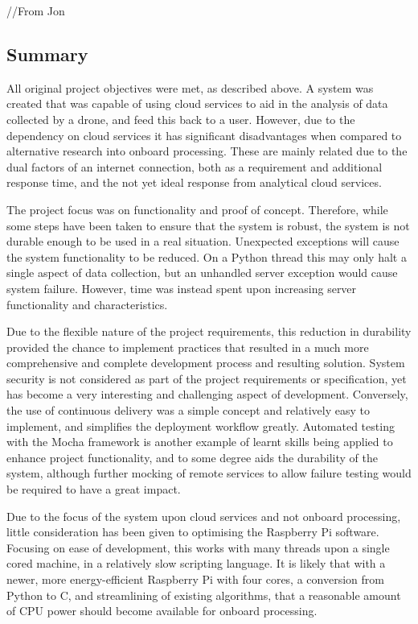 \documentclass{article}
\begin{document}
//From Jon

\subsection{Summary}
All original project objectives were met, as described above. A system was created that was capable of using cloud services to aid in the analysis of data collected by a drone, and feed this back to a user. However, due to the dependency on cloud services it has significant disadvantages when compared to alternative research into onboard processing. These are mainly related due to the dual factors of an internet connection, both as a requirement and additional response time, and the not yet ideal response from analytical cloud services. 

The project focus was on functionality and proof of concept. Therefore, while some steps have been taken to ensure that the system is robust, the system is not durable enough to be used in a real situation. Unexpected exceptions will cause the system functionality to be reduced. On a Python thread this may only halt a single aspect of data collection, but an unhandled server exception would cause system failure. However, time was instead spent upon increasing server functionality and characteristics. 

Due to the flexible nature of the project requirements, this reduction in durability provided the chance to implement practices that resulted in a much more comprehensive and complete development process and resulting solution. System security is not considered as part of the project requirements or specification, yet has become a very interesting and challenging aspect of development. Conversely, the use of continuous delivery was a simple concept and relatively easy to implement, and simplifies the deployment workflow greatly. Automated testing with the Mocha framework is another example of learnt skills being applied to enhance project functionality, and to some degree aids the durability of the system, although further mocking of remote services to allow failure testing would be required to have a great impact.

Due to the focus of the system upon cloud services and not onboard processing, little consideration has been given to optimising the Raspberry Pi software. Focusing on ease of development, this works with many threads upon a single cored machine, in a relatively slow scripting language. It is likely that with a newer, more energy-efficient Raspberry Pi with four cores, a conversion from Python to C, and streamlining of existing algorithms, that a reasonable amount of CPU power should become available for onboard processing.
\end{document}
